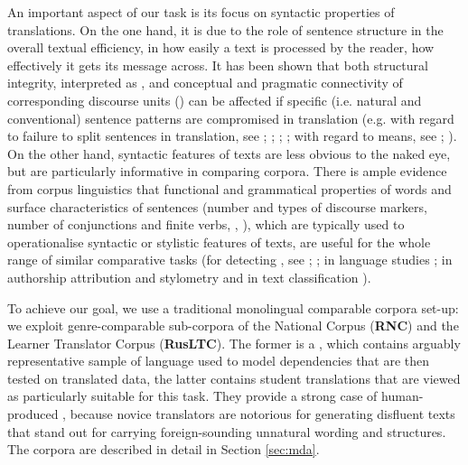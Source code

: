 \documentclass[output=paper]{langsci/langscibook.cls}
\begin{document}
An important aspect of our task is its focus on syntactic properties of translations. On the one hand, it is due to the role of sentence structure in the overall textual efficiency, in how easily a text is processed by the reader, how effectively it gets its message across. It has been shown that both structural integrity, interpreted as , and conceptual and pragmatic connectivity of corresponding discourse units () can be affected if  specific (i.e. natural and conventional) sentence patterns are compromised in translation (e.g. with regard to failure to split sentences in translation, see \citealt{ramm2006dispensing}; \citealt{solfjeld2008sentence}; \citealt{fabricius1999information}; \citealt{gile2008local}; with regard to  means, see \citealt{kachroo1984textual}; \citealt{hatim1990discourse}). On the other hand, syntactic features of texts are less obvious to the naked eye, but are particularly informative in comparing corpora. There is ample evidence from corpus linguistics that functional and grammatical properties of words and surface characteristics of sentences (number and types of discourse markers, number of conjunctions and finite verbs, , ), which are typically used to operationalise syntactic or stylistic features of texts, are useful for the whole range of similar comparative tasks (for detecting , see \citealt{baroni2005new}; \citealt{pastor2008translation}; in  language studies \citealt{hinkel2001matters}; in authorship attribution and stylometry \citealt{Halteren:2007} and in text classification \citealt{Koppel:2002}).

To achieve our goal, we use a traditional monolingual comparable corpora set-up: we exploit genre-comparable sub-corpora of the  National Corpus (\textbf{RNC}) and the  Learner Translator Corpus (\textbf{RusLTC}). The former is a , which contains arguably representative sample of  language used to model dependencies that are then tested on translated data, the latter contains student translations that are viewed as particularly suitable for this task. They provide a strong case of human-produced , because novice translators are notorious for generating disfluent texts that stand out for carrying foreign-sounding unnatural wording and structures. The corpora are described in detail in Section \ref{sec:mda}. 
\end{document}

